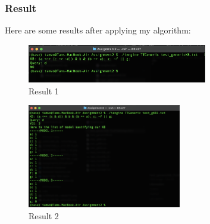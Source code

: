 \documentclass{assignment}
\begin{document}
\subsubsection{Result}
 Here are some results after applying my algorithm:
 
 \begin{figure}[h]
    \centering
    \includegraphics[width=0.7\textwidth]{./assets/test_genericKB_TruthTableAlgorithm.png}
    \caption{Result 1}
    \label{fig:fig99}
\end{figure}
 
  \begin{figure}[h]
    \centering
    \includegraphics[width=0.6\textwidth]{./assets/test_gKB1_TruthTableAlgorithm.png}
    \caption{Result 2}
    \label{fig:fig999}
\end{figure}

 
 
 
\end{document}
